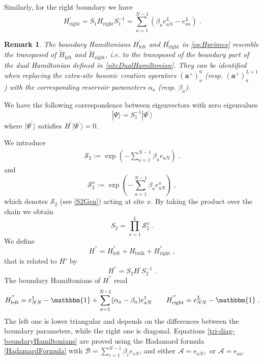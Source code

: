 \documentclass[10pt]{article}
\numberwithin{equation}{section}
\numberwithin{equation}{subsection}
\newtheorem{remark}{Remark}
\newcommand{\co}{\;,}
\newcommand{\dt}{\;.}
\newcommand{\fra}[1]{\textcolor[rgb]{0,0,1}{#1}}
\begin{document}
Similarly, for the right boundary we have 
\begin{equation}
H_{\text{right}}^{'}=S_{1}H_{\text{right}}S_{1}^{-1}=
\sum_{a=1}^{N-1}\left(\beta_{a}e_{aN}^{L}-e_{aa}^{L}\right)\dt
\end{equation}
\begin{remark}
	The boundary Hamiltonians $H_{\text{left}}^{'}$ and $H_{\text{right}}^{'}$ in \eqref{eq:Hprimes} resemble the transposed of  $\widetilde{H}_{\text{left}}$ and $\widetilde{H}_{\text{right}}$, i.e. to the transposed of the boundary part of the dual Hamiltonian  defined in \eqref{siteDualHamiltonian}. They can be identified  when replacing the  extra-site bosonic creation operators $(\mathbf{a}^{+})_{a}^{0}$  (resp. $(\mathbf{a}^{+})_{a}^{L+1}$) with the corresponding reservoir parameters $\alpha_a$ (resp. $\beta_a$).
\end{remark}
We have the following correspondence between eigenvectors with zero eigenvalues
\begin{equation}\label{S1-Inverse}
	|\Psi\rangle =S_{1}^{-1}|\Psi^{'}\rangle
\end{equation}
where $|\Psi^{'}\rangle$ satisfies $H^{'}|\Psi^{'}\rangle=0$.

We introduce
\begin{align} 
	\mathcal{S}_{2}:=\exp{\left(-\sum_{a=1}^{N-1}\beta_{a}e_{aN}\right)}\dt\label{S2Gen}
\end{align}
and
 \begin{equation}
 	\mathcal{S}_{2}^{x}:=\exp{\left(-\sum_{a=1}^{N-1}\beta_{a}e_{aN}^{x}\right)}\co
 \end{equation}
which denotes $\mathcal{S}_{2}$ (see \eqref{S2Gen}) acting at site $x$. By taking the product over the chain we obtain 
\begin{equation}\label{S2-Whole}
	S_{2}=\prod_{x=1}^{L}\mathcal{S}_{2}^{x}\dt
\end{equation}
We define 
\begin{equation}\label{HSecond}
	H^{''}=H_{\text{left}}^{''}+H_{\text{bulk}}+H_{\text{right}}^{''}\co
\end{equation}
that is related to $H'$ by
\begin{equation}
	H^{''}=S_{2}H^{'}S_{2}^{-1}\dt
\end{equation}
The boundary Hamiltonians of $H^{''}$ read
\begin{align}\label{tri-diag-boundaryHamiltonians}
	H_{\text{left}}^{''}=e_{NN}^{1}-\mathbbm{1}+\sum_{a=1}^{N-1}(\alpha_{a}-\beta_{a})e_{aN}^{1}\qquad H_{\text{right}}^{''}=e_{NN}^{L}-\mathbbm{1}\dt
\end{align}
The left one is lower triangular and depends on the differences between the boundary parameters, while the right one is diagonal. Equations \eqref{tri-diag-boundaryHamiltonians} are proved using the Hadamard formula \eqref{HadamardFormula} with $\mathcal{B}=\sum_{c=1}^{N-1}\beta_{c}e_{cN}$\fra{, and either $\mathcal{A}=e_{aN},$ or $\mathcal{A}=e_{aa}$}.
\end{document}
